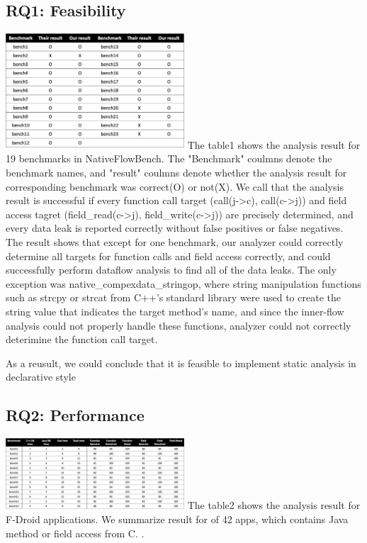 \subsection{RQ1: Feasibility}
\includegraphics[width=0.5\textwidth]{img/table1}
The table1 shows the analysis result for 19 benchmarks in NativeFlowBench.  The
"Benchmark" coulmns denote the benchmark names, and "result" coulmns denote
whether the analysis result for corresponding benchmark was correct(O) or
not(X). We call that the analysis result is successful if every function call
target (call(j->c), call(c->j)) and field access tagret (field\_read(c->j),
field\_write(c->j)) are precisely determined, and every data leak is reported
correctly without false positives or false negatives.  The result shows that
except for one benchmark, our analyzer could correctly determine all targets
for function calls and field access correctly, and could successfully perform
dataflow analysis to find all of the data leaks. The only exception was
native\_compexdata\_stringop, where string manipulation functions such as
strcpy or strcat from C++'s standard library were used to create the string
value that indicates the target method's name, and since the inner-flow
analysis could not properly handle these functions, analyzer could not
correctly deterimine the function call target.

As a reusult, we could conclude that it is feasible to implement
static analysis in declarative style


\subsection{RQ2: Performance}
\includegraphics[width=0.5\textwidth]{img/table2}
The table2 shows the analysis result for F-Droid applications. We summarize
result for  of 42 apps, which contains Java method or field access
from C. .

